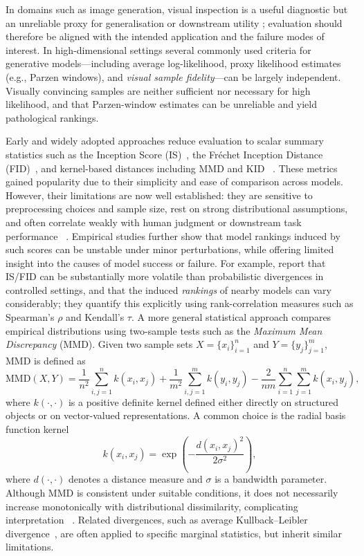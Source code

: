 In domains such as image generation, visual inspection is a useful diagnostic but an unreliable proxy for generalisation or downstream utility\citep{theis2016note} ; evaluation should therefore be aligned with the intended application and
the failure modes of interest. In high-dimensional settings
several commonly used criteria for generative models---including average log-likelihood,
proxy likelihood estimates (e.g., Parzen windows), and \emph{visual sample fidelity}---can be
largely independent. Visually
convincing samples are neither sufficient nor necessary for high likelihood, and that Parzen-window estimates can be unreliable and yield pathological rankings.  

Early and widely adopted approaches reduce evaluation to scalar summary statistics such
as the Inception Score (IS)~\citep{salimans2016improved}, the Fr\'echet Inception Distance
(FID)~\citep{heusel2017gans}, and kernel-based distances including MMD and KID
~\citep{gretton2012kernel,binkowski2018demystifying}. These metrics gained popularity due
to their simplicity and ease of comparison across models. However, their limitations are
now well established: they are sensitive to preprocessing choices and sample size, rest
on strong distributional assumptions, and often correlate weakly with human judgment or
downstream task performance
~\citep{theis2016note,barratt2018note,chong2020effectively,parmar2022aliased,borji2019pros,borji2022pros,betzalel2024evaluation,stein2023exposing}.
Empirical studies further show that model rankings induced by such scores can be unstable
under minor perturbations, while offering limited insight into the causes of model success
or failure. For example, \citet{betzalel2024evaluation} report that IS/FID can be substantially
more volatile than probabilistic divergences in controlled settings, and that the induced \emph{rankings}
of nearby models can vary considerably; they quantify this explicitly using rank-correlation
measures such as Spearman's $\rho$ and Kendall's $\tau$.
A more general statistical approach compares empirical distributions using two-sample
tests such as the \emph{Maximum Mean Discrepancy} (MMD). Given two sample sets
\(X = \{x_i\}_{i=1}^n\) and \(Y = \{y_j\}_{j=1}^m\), MMD is defined as
\[
\mathrm{MMD}(X,Y) =
\frac{1}{n^2}\sum_{i,j=1}^n k(x_i,x_j)
+ \frac{1}{m^2}\sum_{i,j=1}^m k(y_i,y_j)
- \frac{2}{nm}\sum_{i=1}^n\sum_{j=1}^m k(x_i,y_j),
\]
where \(k(\cdot,\cdot)\) is a positive definite kernel defined either directly on structured
objects or on vector-valued representations. A common choice is the radial basis function
kernel
\[
k(x_i, x_j) = \exp\!\left(-\frac{d(x_i, x_j)^2}{2\sigma^2}\right),
\]
where \(d(\cdot,\cdot)\) denotes a distance measure and \(\sigma\) is a bandwidth parameter.
Although MMD is consistent under suitable conditions, it does not necessarily increase
monotonically with distributional dissimilarity, complicating interpretation
~\citep{obrady2021evaluation}. Related divergences, such as average Kullback--Leibler
divergence~\citep{kullback1951information}, are often applied to specific marginal
statistics, but inherit similar limitations.

